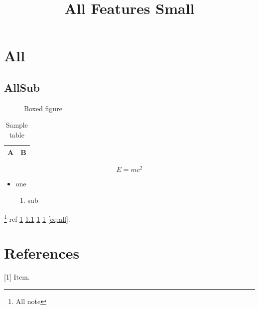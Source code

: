 \documentclass{article}
\begin{document}
\title{All Features Small}\maketitle
\section{All}\label{sec:all}\subsection{AllSub}\label{sub:all}\begin{figure}[h]\centering{}\caption{Boxed figure}\label{fig:all}\end{figure}\begin{table}[h]\centering\caption{Sample table}\label{tab:all}\begin{tabular}{|l|l|}\hline A&B\\\hline\end{tabular}\end{table}\begin{equation}E=mc^2\label{eq:all}\end{equation}\begin{itemize}\item one\begin{enumerate}\item sub\end{enumerate}\end{itemize}\footnote{All note} ref \ref{sec:all} \ref{sub:all} \ref{fig:all} \ref{tab:all} \ref{eq:all}.\section{References} [1] Item.
\end{document}
